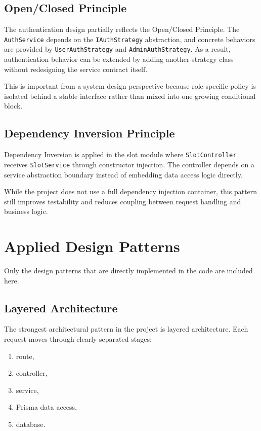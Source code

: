 \documentclass[12pt,a4paper]{article}
\begin{document}
\subsection{Open/Closed Principle}
The authentication design partially reflects the Open/Closed Principle. The \texttt{AuthService} depends on the \texttt{IAuthStrategy} abstraction, and concrete behaviors are provided by \texttt{UserAuthStrategy} and \texttt{AdminAuthStrategy}. As a result, authentication behavior can be extended by adding another strategy class without redesigning the service contract itself.

This is important from a system design perspective because role-specific policy is isolated behind a stable interface rather than mixed into one growing conditional block.

\subsection{Dependency Inversion Principle}
Dependency Inversion is applied in the slot module where \texttt{SlotController} receives \texttt{SlotService} through constructor injection. The controller depends on a service abstraction boundary instead of embedding data access logic directly.

While the project does not use a full dependency injection container, this pattern still improves testability and reduces coupling between request handling and business logic.

\section{Applied Design Patterns}
Only the design patterns that are directly implemented in the code are included here.

\subsection{Layered Architecture}
The strongest architectural pattern in the project is layered architecture. Each request moves through clearly separated stages:
\begin{enumerate}
    \item route,
    \item controller,
    \item service,
    \item Prisma data access,
    \item database.
\end{enumerate}
\end{document}
